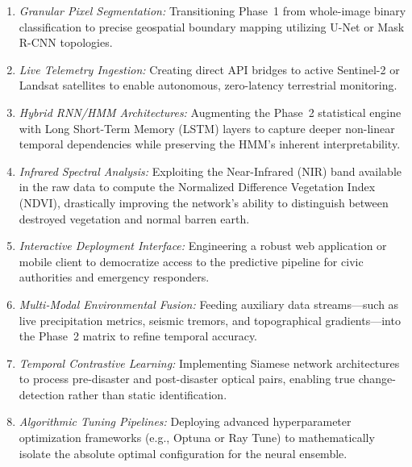 \documentclass[12pt,a4paper]{report}
\begin{document}
\begin{enumerate}
    \item \textit{Granular Pixel Segmentation:} Transitioning Phase~1 from whole-image binary classification to precise geospatial boundary mapping utilizing U-Net or Mask R-CNN topologies.
    \item \textit{Live Telemetry Ingestion:} Creating direct API bridges to active Sentinel-2 or Landsat satellites to enable autonomous, zero-latency terrestrial monitoring.
    \item \textit{Hybrid RNN/HMM Architectures:} Augmenting the Phase~2 statistical engine with Long Short-Term Memory (LSTM) layers to capture deeper non-linear temporal dependencies while preserving the HMM's inherent interpretability.
    \item \textit{Infrared Spectral Analysis:} Exploiting the Near-Infrared (NIR) band available in the raw data to compute the Normalized Difference Vegetation Index (NDVI), drastically improving the network's ability to distinguish between destroyed vegetation and normal barren earth.
    \item \textit{Interactive Deployment Interface:} Engineering a robust web application or mobile client to democratize access to the predictive pipeline for civic authorities and emergency responders.
    \item \textit{Multi-Modal Environmental Fusion:} Feeding auxiliary data streams—such as live precipitation metrics, seismic tremors, and topographical gradients—into the Phase~2 matrix to refine temporal accuracy.
    \item \textit{Temporal Contrastive Learning:} Implementing Siamese network architectures to process pre-disaster and post-disaster optical pairs, enabling true change-detection rather than static identification.
    \item \textit{Algorithmic Tuning Pipelines:} Deploying advanced hyperparameter optimization frameworks (e.g., Optuna or Ray Tune) to mathematically isolate the absolute optimal configuration for the neural ensemble.
\end{enumerate}
\end{document}
